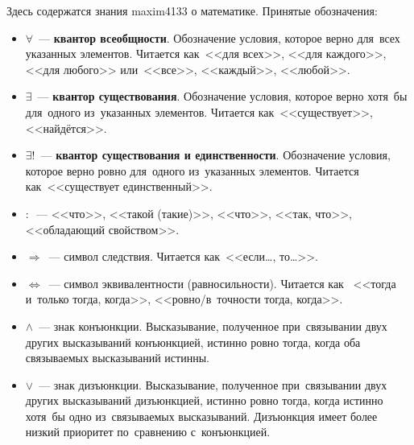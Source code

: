 	Здесь содержатся знания maxim4133 о математике. Принятые обозначения:
\begin{itemize}
	\item $\forall$~--- \textbf{квантор всеобщности}. Обозначение условия, которое верно для~всех
	указанных элементов. Читается как~<<для всех>>, <<для каждого>>, <<для любого>> или~<<все>>,
	<<каждый>>, <<любой>>.
	\item $\exists$~--- \textbf{квантор существования}. Обозначение условия, которое верно хотя~бы
	для~одного из~указанных элементов. Читается как~<<существует>>, <<найдётся>>.
	\item $\exists!$~--- \textbf{квантор существования и единственности}. Обозначение условия,
	которое верно ровно для~одного из~указанных элементов. Читается как~<<существует единственный>>.
	\item $\colon$~--- <<что>>, <<такой (такие)>>, <<что>>, <<так, что>>, <<обладающий свойством>>.
	\item $\Rightarrow$~--- символ следствия. Читается как~<<если\dots, то\dots>>.
	\item $\Leftrightarrow$~--- символ эквивалентности (равносильности). Читается как
	~<<тогда и~только тогда, когда>>, <<ровно/в~точности тогда, когда>>.
	\item $\land$~--- знак конъюнкции. Высказывание, полученное при~связывании двух других
	высказываний конъюнкцией, истинно ровно тогда, когда оба связываемых высказываний истинны.
	\item $\lor$~--- знак дизъюнкции. Высказывание, полученное при~связывании двух других
	высказываний дизъюнкцией, истинно ровно тогда, когда истинно хотя~бы одно из~связываемых
	высказываний. Дизъюнкция имеет более низкий приоритет по~сравнению с~конъюнкцией.
\end{itemize}